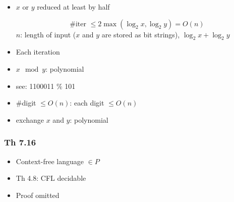 \begin{frame}[allowframebreaks]
\begin{itemize}
\item [] $x$ or $y$ reduced at least by half 

  \begin{equation*}
\text{\#iter } \leq 2\max(\log_2 x, \log_2 y)= O(n)
\end{equation*}
$n$: length of input ($x$ and $y$ are stored as bit strings), $\log_2 x + \log_2 y$
\item Each iteration

\item [] $x \mod y$:  polynomial

\item [] see: 1100011 \% 101

\item [] \#digit $\leq O(n)$: each digit $\leq O(n)$

\item [] exchange $x$ and $y$: polynomial

\end{itemize}\end{frame}

\begin{frame}[allowframebreaks] \frametitle{Th 7.16}
  \begin{itemize}
\item Context-free language $\in P$

\item Th 4.8: CFL decidable

\item Proof omitted
\end{itemize}\end{frame}


